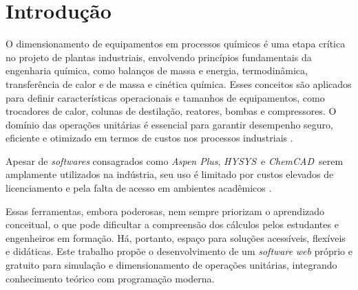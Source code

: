 \chapter{Introdução}

O dimensionamento de equipamentos em processos químicos é uma etapa crítica no projeto de plantas industriais, envolvendo princípios fundamentais da engenharia química, como balanços de massa e energia, termodinâmica, transferência de calor e de massa e cinética química. Esses conceitos são aplicados para definir características operacionais e tamanhos de equipamentos, como trocadores de calor, colunas de destilação, reatores, bombas e compressores. O domínio das operações unitárias é essencial para garantir desempenho seguro, eficiente e otimizado em termos de custos nos processos industriais \cite{felder2005}.

Apesar de \textit{softwares} consagrados como \textit{Aspen Plus}\textregistered, \textit{HYSYS}\textregistered\ e \textit{ChemCAD}\textregistered\ serem amplamente utilizados na indústria, seu uso é limitado por custos elevados de licenciamento e pela falta de acesso em ambientes acadêmicos \cite{aspen2025, chemcad2025, alves2022}.

Essas ferramentas, embora poderosas, nem sempre priorizam o aprendizado conceitual, o que pode dificultar a compreensão dos cálculos pelos estudantes e engenheiros em formação. Há, portanto, espaço para soluções acessíveis, flexíveis e didáticas. Este trabalho propõe o desenvolvimento de um \textit{software} \textit{web} próprio e gratuito para simulação e dimensionamento de operações unitárias, integrando conhecimento teórico com programação moderna.